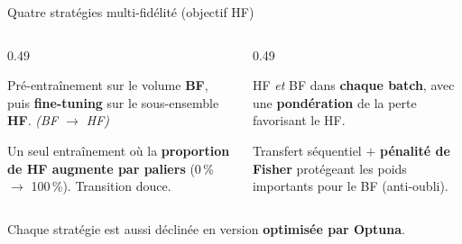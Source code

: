 \documentclass[aspectratio=169, 11pt]{beamer}
\newcommand{\HF}{\textbf{HF}}
\newcommand{\BF}{\textbf{BF}}
\begin{document}
\begin{frame}{Quatre stratégies multi-fidélité (objectif HF)}
  \begin{columns}[t]
    \begin{column}{0.49\textwidth}
      \begin{card}
        Pré-entraînement sur le volume \BF, puis \textbf{fine-tuning} sur le sous-ensemble \HF.
        \emph{(BF $\rightarrow$ HF)}
      \end{card}
      \vspace{4pt}
      \begin{card}
        Un seul entraînement où la \textbf{proportion de HF augmente par paliers}
        (0\,\% $\rightarrow$ 100\,\%). Transition douce.
      \end{card}
    \end{column}
    \begin{column}{0.49\textwidth}
      \begin{card}
        HF \emph{et} BF dans \textbf{chaque batch}, avec une \textbf{pondération}
        de la perte favorisant le HF.
      \end{card}
      \vspace{4pt}
      \begin{card}
        Transfert séquentiel $+$ \textbf{pénalité de Fisher} protégeant les poids
        importants pour le BF (anti-oubli).
      \end{card}
    \end{column}
  \end{columns}
  \vspace{0.3em}
  \begin{center}\scriptsize\color{muted}
    Chaque stratégie est aussi déclinée en version \textbf{optimisée par Optuna}.
  \end{center}
\end{frame}
\end{document}
